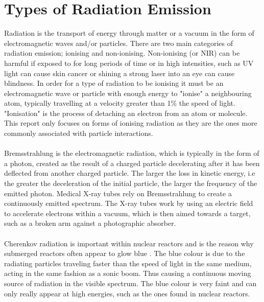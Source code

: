 \documentclass[12pt,a4paper]{article}
\begin{document}

\section{Types of Radiation Emission }
\label{radd}
Radiation is the transport of energy through matter or a vacuum in the form of electromagnetic waves and/or particles. There are two main categories of radiation emission; ionising and non-ionising. Non-ionising (or NIR) can be harmful if exposed to for long periods of time or in high intensities, such as UV light can cause skin cancer or shining a strong laser into an eye can cause blindness. In order for a type of radiation to be ionising it must be an electromagnetic wave or particle with enough energy to "ionise" a neighbouring atom, typically travelling at a velocity greater than 1\% the speed of light.  "Ionisation" is the process of detaching an electron from an atom or molecule. This report only focuses on forms of ionising radiation as they are the ones more commonly associated with particle interactions. 
\\\\ 
\noindent Bremsstrahlung is the electromagnetic radiation, which is typically in the form of a photon, created as the result of a charged particle decelerating after it has been deflected from another charged particle. The larger the loss in kinetic energy, i.e the greater the deceleration of the initial particle, the larger the frequency of the emitted photon. Medical X-ray tubes rely on Bremsstrahlung to create a continuously emitted spectrum. The X-ray tubes work by using an electric field to accelerate electrons within a vacuum, which is then aimed towards a target, such as a broken arm against a photographic absorber.
\\\\
\noindent Cherenkov radiation is important within nuclear reactors and is the reason why submerged reactors often appear to glow blue \cite{blue}. The blue colour is due to the radiating particles traveling faster than the speed of light in the same medium, acting in the same fashion as a sonic boom. Thus causing a continuous moving source of radiation in the visible spectrum. The blue colour is very faint and can only really appear at high energies, such as the ones found in nuclear reactors. 

\end{document}
